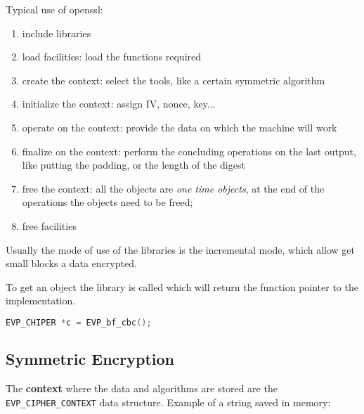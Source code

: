 \documentclass[12pt]{article}
\begin{document}
Typical use of openssl:
\begin{enumerate}
  \item include libraries
  \item load facilities: load the functions required
  \item create the context: select the tools, like a certain symmetric algorithm
  \item initialize the context: assign IV, nonce, key...
  \item operate on the context: provide the data on which the machine will work
  \item finalize on the context: perform the concluding operations on the last output, like putting the padding, or the length of the digest
  \item free the context: all the objects are \emph{one time objects}, at the end of the operations the objects need to be freed;
  \item free facilities
\end{enumerate}
Usually the mode of use of the libraries is the incremental mode, which allow get small blocks a data encrypted.

To get an object the library is called which will return the function pointer to the implementation.
\begin{lstlisting}[language=c]
EVP_CHIPER *c = EVP_bf_cbc();
\end{lstlisting}


\subsection{Symmetric Encryption}
The \textbf{context} where the data and algorithms are stored are the \texttt{EVP_CIPHER_CONTEXT} data structure.
Example of a string saved in memory:
\end{document}
